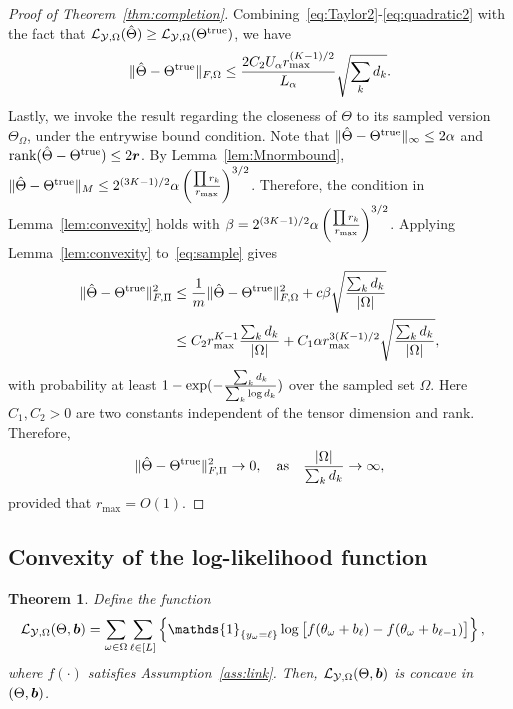 \documentclass[11pt]{article}
\theoremstyle{plain}
\newtheorem{thm}{Theorem}[section]
\theoremstyle{definition}
\begin{document}
\begin{proof}[Proof of Theorem~\ref{thm:completion}]
Combining~\eqref{eq:Taylor2}-\eqref{eq:quadratic2} with the fact that $\mathcal{L}_{\mathcal{Y},\Omega}(\hat \Theta)\geq \mathcal{L}_{\mathcal{Y},\Omega}(\Theta^{\mathrm{true}})$, we have
\begin{equation}\label{eq:sample}
\lVert\hat \Theta-\Theta^{\mathrm{true}}\rVert_{F,\Omega}\leq {2C_2U_\alpha  r_{\max}^{(K-1)/2} \over L_\alpha} \sqrt{\sum_kd_k}.
\end{equation}
Lastly, we invoke the result regarding the closeness of $\Theta$ to its sampled version $\Theta_{\Omega}$, under the entrywise bound condition. Note that $\lVert\hat\Theta-\Theta^{\mathrm{true}}\rVert_\infty\leq 2\alpha$ and $\text{rank}(\hat \Theta-\Theta^{\mathrm{true}})\leq 2\bm{r}$. By Lemma~\ref{lem:Mnormbound}, $\lVert\hat \Theta-\Theta^{\mathrm{true}}\rVert_M\leq 2^{(3K-1)/2} \alpha \left({\prod r_k \over r_{\max}}\right)^{3/2}$. Therefore, the condition in Lemma~\ref{lem:convexity} holds with $\beta=2^{(3K-1)/2}\alpha \left({\prod r_k \over r_{\max}}\right)^{3/2}$.
Applying Lemma~\ref{lem:convexity} to~\eqref{eq:sample} gives
\begin{align}
 \lVert\hat \Theta-\Theta^{\mathrm{true}}\rVert_{F,\Pi}^2&\leq {1\over m}\lVert\hat \Theta-\Theta^{\mathrm{true}}\rVert_{F,\Omega}^2+c\beta\sqrt{\sum_k d_k\over |\Omega|}\\
 &\leq {C_2  r^{K-1}_{\max}} {\sum_k d_k \over |\Omega|}+C_1 \alpha r_{\max}^{3(K-1)/2}\sqrt{\sum_kd_k\over |\Omega|},
\end{align}
with probability at least $1-\exp(-{\sum_kd_k\over \sum_k \log d_k})$ over the sampled set $\Omega$. Here $C_1, C_2>0$ are two constants independent of the tensor dimension and rank. Therefore,
\[
 \lVert\hat \Theta-\Theta^{\mathrm{true}}\rVert_{F,\Pi}^2\to 0,\quad \text{as}\quad {|\Omega|\over \sum_kd_k}\to \infty,
\]
provided that $r_{\max}=O(1)$.
\end{proof}

\subsection{Convexity of the log-likelihood function}
\begin{thm}\label{thm:convexity}
Define the function
\begin{align}\label{eq:function}
 \logl(\Theta, \mb)&=\sum_{\omega\in\Omega}\sum_{\ell\in[L]} \left\{\mathds{1}_{\{y_\omega=\ell\}} \log \big[f(\theta_\omega+b_\ell)-  f(\theta_\omega+b_{\ell-1})\big]\right\},
 \end{align}
where $f(\cdot)$ satisfies Assumption~\ref{ass:link}. Then, $\mathcal{L}_{\mathcal{Y},\Omega}(\Theta, \bm{b})$ is concave in $(\Theta,\bm{b})$. 
\end{thm}
\end{document}
